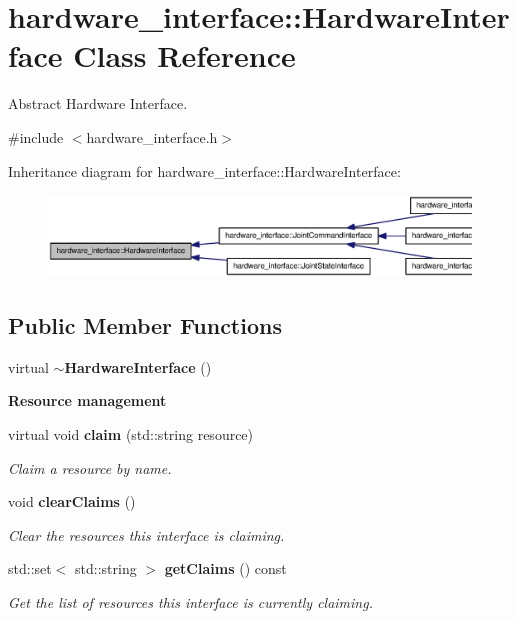 \section{hardware\-\_\-interface\-:\-:\-Hardware\-Interface \-Class \-Reference}
\label{classhardware__interface_1_1HardwareInterface}


\-Abstract \-Hardware \-Interface.  




{\ttfamily \#include $<$hardware\-\_\-interface.\-h$>$}



\-Inheritance diagram for hardware\-\_\-interface\-:\-:\-Hardware\-Interface\-:
\nopagebreak
\begin{figure}[H]
\begin{center}
\leavevmode
\includegraphics[width=350pt]{classhardware__interface_1_1HardwareInterface__inherit__graph}
\end{center}
\end{figure}
\subsection*{\-Public \-Member \-Functions}
\begin{DoxyCompactItemize}
\item 
virtual {\bf $\sim$\-Hardware\-Interface} ()
\end{DoxyCompactItemize}
\begin{Indent}{\bf \-Resource management}\par
\begin{DoxyCompactItemize}
\item 
virtual void {\bf claim} (std\-::string resource)
\begin{DoxyCompactList}\small\item\em \-Claim a resource by name. \end{DoxyCompactList}\item 
void {\bf clear\-Claims} ()
\begin{DoxyCompactList}\small\item\em \-Clear the resources this interface is claiming. \end{DoxyCompactList}\item 
std\-::set$<$ std\-::string $>$ {\bf get\-Claims} () const 
\begin{DoxyCompactList}\small\item\em \-Get the list of resources this interface is currently claiming. \end{DoxyCompactList}\end{DoxyCompactItemize}
\end{Indent}
